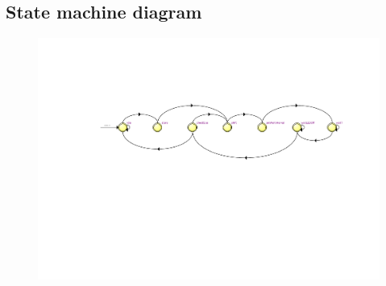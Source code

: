 \documentclass[13pt,a4paper]{report}
\begin{document}
\subsection{State machine diagram}\begin{figure}[H]
\centering
\includegraphics[scale=0.8, clip, trim={5cm 7.3cm 3cm 5cm}]{images/Exc4_FSM.pdf}
\end{figure}
\end{document}
